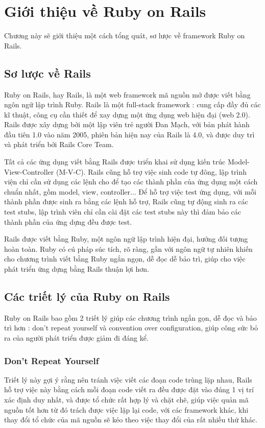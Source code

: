 \chapter{Giới thiệu về Ruby on Rails}
Chương này sẽ giới thiệu một cách tổng quát, sơ lược về framework Ruby on Rails.
\section{Sơ lược về Rails}
Ruby on Rails, hay Rails, là một web framework mã nguồn mở được viết bằng ngôn ngữ lập trình Ruby. Rails là một full-stack framework : cung cấp đầy đủ các kĩ thuật, công cụ cần thiết để xay dựng một ứng dụng web hiện đại (web 2.0). Rails được xây dựng bởi một lập viên trẻ người Đan Mạch, với bản phát hành đầu tiên 1.0 vào năm 2005, phiên bản hiện nay của Rails là 4.0, và được duy trì và phát triển bởi Rails Core Team.

Tất cả các ứng dụng viết bằng Rails được triển khai sử dụng kiến trúc Model-View-Controller (M-V-C). Rails cũng hỗ trợ việc sinh code tự đông, lập trình viện chỉ cần sử dụng các lệnh cho để tạo các thành phần của ứng dụng một cách chuẩn nhất, gồm model, view, controller... Để hỗ trợ việc test ứng dụng, với mỗi thành phần được sinh ra bằng các lệnh hỗ trợ, Rails cũng tự động sinh ra các test stubs, lập trình viên chỉ cần cài đặt các test stubs này thì đảm bảo các thành phần của ứng dựng đều được test.

Rails được viết bằng Ruby, một ngôn ngữ lập trình hiện đại, hướng đối tượng hoàn toàn. Ruby có cú pháp súc tích, rõ ràng, gần với ngôn ngữ tự nhiên khiến cho chương trình viết bằng Ruby ngắn ngọn, dễ đọc dễ bảo trì, giúp cho việc phát triển ứng dựng bằng Rails thuận lợi hơn.
\section{Các triết lý của Ruby on Rails}
Ruby on Rails bao gồm 2 triết lý giúp các chương trình ngắn gọn, dễ đọc và bảo trì hơn : don't repeat yourself và convention over configuration, giúp công sức bỏ ra của người phát triển được giảm đi đáng kể.
\subsection{Don't Repeat Yourself}
Triết lý này gợi ý rằng nên tránh việc viết các đoạn code trùng lặp nhau, Rails hỗ trợ việc này bằng cách mỗi đoạn code viết ra đều được đặt vào đúng 1 vị trí xác định duy nhất, và được tổ chức rất hợp lý và chặt chẽ, giúp việc quản mã nguồn tốt hơn từ đó trách được việc lặp lại code, với các framework khác, khi thay đổi tổ chức của mã nguồn sẽ kéo theo việc thay đổi của rất nhiều thứ khác.
